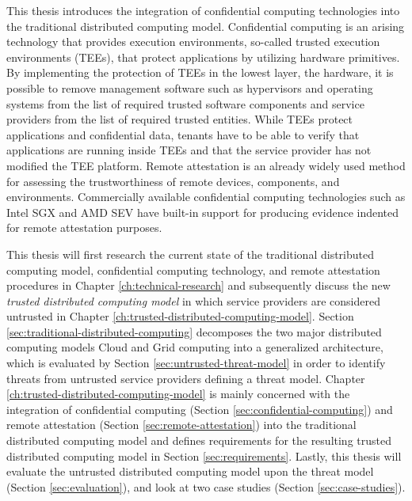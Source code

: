 This thesis introduces the integration of confidential computing technologies
into the traditional distributed computing model. Confidential computing is an
arising technology that provides execution environments, so-called trusted
execution environments (TEEs), that protect applications by utilizing hardware
primitives. By implementing the protection of TEEs in the lowest layer, the
hardware, it is possible to remove management software such as hypervisors and
operating systems from the list of required trusted software components and
service providers from the list of required trusted entities. While TEEs protect
applications and confidential data, tenants have to be able to verify that
applications are running inside TEEs and that the service provider has not
modified the TEE platform. Remote attestation is an already widely used method
for assessing the trustworthiness of remote devices, components, and
environments. Commercially available confidential computing technologies such as
Intel SGX and AMD SEV have built-in support for producing evidence indented for
remote attestation purposes.

This thesis will first research the current state of the traditional distributed
computing model, confidential computing technology, and remote attestation
procedures in Chapter \ref{ch:technical-research} and subsequently discuss the
new \textit{trusted distributed computing model} in which service providers are
considered untrusted in Chapter \ref{ch:trusted-distributed-computing-model}.
Section \ref{sec:traditional-distributed-computing} decomposes the two major
distributed computing models Cloud and Grid computing into a generalized
architecture, which is evaluated by Section \ref{sec:untrusted-threat-model} in
order to identify threats from untrusted service providers defining a threat
model. Chapter \ref{ch:trusted-distributed-computing-model} is mainly concerned
with the integration of confidential computing (Section
\ref{sec:confidential-computing}) and remote attestation (Section
\ref{sec:remote-attestation}) into the traditional distributed computing model
and defines requirements for the resulting trusted distributed computing model
in Section \ref{sec:requirements}. Lastly, this thesis will evaluate the
untrusted distributed computing model upon the threat model (Section
\ref{sec:evaluation}), and look at two case studies (Section
\ref{sec:case-studies}).
